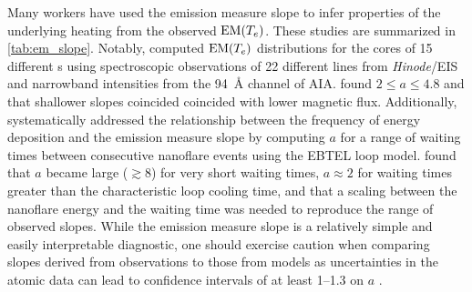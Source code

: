 Many workers have used the emission measure slope to infer properties of the underlying heating from the observed $\textup{EM}(T_e)$. These studies are summarized in \autoref{tab:em_slope}. Notably, \citet{warren_systematic_2012} computed $\textup{EM}(T_e)$ distributions for the cores of 15 different \AR s using spectroscopic observations of 22 different lines from \textit{Hinode}/EIS and narrowband intensities from the \SI{94}{\angstrom} channel of AIA. \citeauthor{warren_systematic_2012} found $2\le a\le 4.8$ and that shallower slopes coincided coincided with lower magnetic flux. Additionally, \citet{cargill_active_2014} systematically addressed the relationship between the frequency of energy deposition and the emission measure slope by computing $a$ for a range of waiting times between consecutive nanoflare events using the EBTEL loop model. \citeauthor{cargill_active_2014} found that $a$ became large ($\gtrsim8$) for very short waiting times, $a\approx2$ for waiting times greater than the characteristic loop cooling time, and that a scaling between the nanoflare energy and the waiting time was needed to reproduce the range of observed slopes. While the emission measure slope is a relatively simple and easily interpretable diagnostic, one should exercise caution when comparing slopes derived from observations to those from models as uncertainties in the atomic data can lead to confidence intervals of at least \numrange{1}{1.3} on $a$ \citep{guennou_can_2013}.

